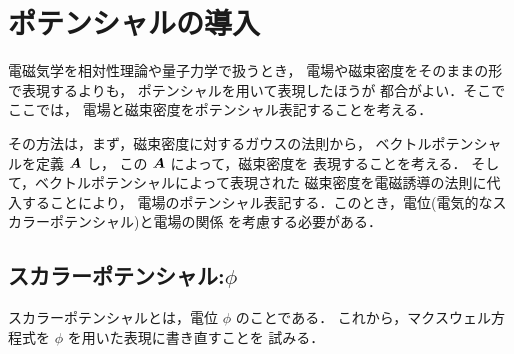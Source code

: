     \section{ポテンシャルの導入}
        \begin{mycomment}
            電磁気学を相対性理論や量子力学で扱うとき，
            電場や磁束密度をそのままの形で表現するよりも，
            ポテンシャルを用いて表現したほうが
            都合がよい．そこでここでは，
            電場と磁束密度をポテンシャル表記することを考える．

            その方法は，まず，磁束密度に対するガウスの法則から，
            ベクトルポテンシャルを定義 $\boldsymbol{A}$ し，
            この $\boldsymbol{A}$ によって，磁束密度を
            表現することを考える．
            そして，ベクトルポテンシャルによって表現された
            磁束密度を電磁誘導の法則に代入することにより，
            電場のポテンシャル表記する．このとき，電位(電気的なスカラーポテンシャル)と電場の関係
            を考慮する必要がある．
        \end{mycomment}
        \subsection{スカラーポテンシャル:$\phi$}
            スカラーポテンシャルとは，電位 $\phi$ のことである．
            これから，マクスウェル方程式を $\phi$ を用いた表現に書き直すことを
            試みる．

